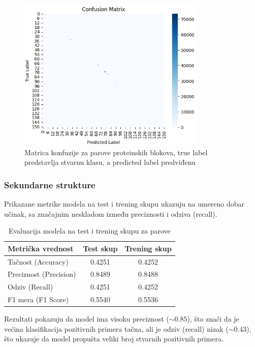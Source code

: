 \documentclass[a4paper,12pt]{article}
\begin{document}
\bigskip


\begin{figure}[htbp]
    \centering
    \includegraphics[width=0.8\textwidth]{./images/conf_mat_pb.png}
    \caption{Matrica konfuzije za parove proteinskih blokova, true label predstavlja stvarnu klasu, a predicted label predviđenu}
    \label{Slika:confmatpb}
\end{figure}


\subsubsection*{Sekundarne strukture}

Prikazane metrike modela na test i trening skupu ukazuju na umereno dobar učinak, sa značajnim neskladom između preciznosti i odziva (recall).

\begin{table}[h!]
\centering
\caption{Evaluacija modela na test i trening skupu za parove }
\begin{tabular}{l|cc}
\textbf{Metrička vrednost} & \textbf{Test skup} & \textbf{Trening skup} \\
\hline
Tačnost (Accuracy)     & 0.4251 & 0.4252 \\
Preciznost (Precision) & 0.8489 & 0.8488 \\
Odziv (Recall)         & 0.4251 & 0.4252 \\
F1 mera (F1 Score)     & 0.5540 & 0.5536 \\
\end{tabular}
\end{table}

\bigskip

Rezultati pokazuju da model ima visoku preciznost ($\sim0.85$), što znači da je većina klasifikacija pozitivnih primera tačna, ali je odziv (recall) nizak ($\sim0.43$), što ukazuje da model propušta veliki broj stvarnih pozitivnih primera.
\end{document}
